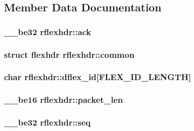 \subsection{Member Data Documentation}
\subsubsection[{\texorpdfstring{ack}{ack}}]{\setlength{\rightskip}{0pt plus 5cm}\+\_\+\+\_\+be32 rflexhdr\+::ack}\hypertarget{structrflexhdr_ae799b07034366e7e68c5b441f816e183}{}\label{structrflexhdr_ae799b07034366e7e68c5b441f816e183}
\subsubsection[{\texorpdfstring{common}{common}}]{\setlength{\rightskip}{0pt plus 5cm}struct {\bf flexhdr} rflexhdr\+::common}\hypertarget{structrflexhdr_a0e80ead5eb57aba13d18f75f0906569c}{}\label{structrflexhdr_a0e80ead5eb57aba13d18f75f0906569c}
\subsubsection[{\texorpdfstring{dflex\+\_\+id}{dflex_id}}]{\setlength{\rightskip}{0pt plus 5cm}char rflexhdr\+::dflex\+\_\+id\mbox{[}{\bf F\+L\+E\+X\+\_\+\+I\+D\+\_\+\+L\+E\+N\+G\+TH}\mbox{]}}\hypertarget{structrflexhdr_a091799a62ae442e024334d0eb4cb86b6}{}\label{structrflexhdr_a091799a62ae442e024334d0eb4cb86b6}
\subsubsection[{\texorpdfstring{packet\+\_\+len}{packet_len}}]{\setlength{\rightskip}{0pt plus 5cm}\+\_\+\+\_\+be16 rflexhdr\+::packet\+\_\+len}\hypertarget{structrflexhdr_a2cc8c14fec43032de69ef360ffc4dfbe}{}\label{structrflexhdr_a2cc8c14fec43032de69ef360ffc4dfbe}
\subsubsection[{\texorpdfstring{seq}{seq}}]{\setlength{\rightskip}{0pt plus 5cm}\+\_\+\+\_\+be32 rflexhdr\+::seq}\hypertarget{structrflexhdr_a5ef194bf9db68ec8f6b050ca9608bd75}{}\label{structrflexhdr_a5ef194bf9db68ec8f6b050ca9608bd75}
